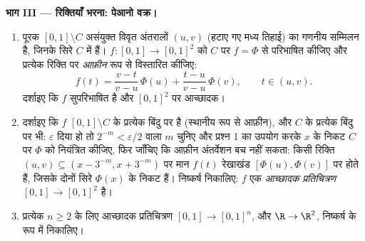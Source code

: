 \begin{problem}
\medskip
\noindent\textbf{भाग III --- रिक्तियाँ भरना: पेआनो वक्र।}
\begin{enumerate}[resume]
  \item पूरक $[0,1] \setminus C$ असंयुक्त विवृत अंतरालों $(u, v)$ (हटाए गए मध्य
        तिहाई) का गणनीय सम्मिलन है, जिनके सिरे $C$ में हैं।
        $f \colon
        [0,1] \to [0,1]^2$ को $C$ पर $f = \Phi$ से परिभाषित कीजिए और प्रत्येक
        रिक्ति पर \emph{आफ़ीन} रूप से विस्तारित कीजिए:
        \[
        f(t) = \frac{v - t}{v - u}\,\Phi(u) +
        \frac{t - u}{v - u}\,\Phi(v),
        \qquad t \in (u, v).
        \]
        दर्शाइए कि $f$ सुपरिभाषित है और $[0,1]^2$ पर आच्छादक।
  \item दर्शाइए कि $f$ $[0,1]
        \setminus C$ के प्रत्येक बिंदु पर  है
        (स्थानीय रूप से आफ़ीन), और $C$ के प्रत्येक बिंदु पर भी:
        $\varepsilon$ दिया हो तो $2^{-m} <
        \varepsilon/2$ वाला $m$ चुनिए और प्रश्न 1 का
        उपयोग करके $x$ के निकट $C$ पर $\Phi$ को नियंत्रित
        कीजिए, फिर जाँचिए कि आफ़ीन अंतर्वेशन बच नहीं सकता: किसी
        रिक्ति $(u,v) \subseteq
        (x - 3^{-m}, x + 3^{-m})$ पर मान $f(t)$ रेखाखंड $[\Phi(u), \Phi(v)]$ पर होते हैं,
        जिसके दोनों सिरे $\Phi(x)$ के निकट हैं। निष्कर्ष निकालिए:
        $f$ एक \emph{ आच्छादक प्रतिचित्रण} $[0,1] \to [0,1]^2$ है।
  \item प्रत्येक $n \geq 2$ के लिए  आच्छादक प्रतिचित्रण $[0,1] \to [0,1]^n$, और
        $\R \to \R^2$, निष्कर्ष के रूप में निकालिए।
\end{enumerate}


\end{problem}
